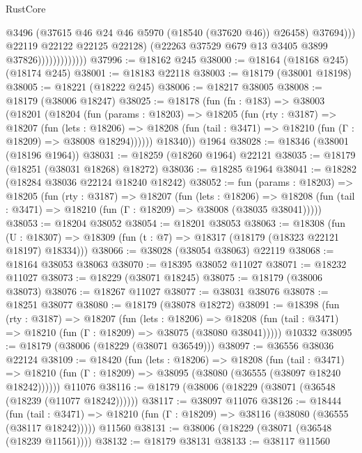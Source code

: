 \begin{lexlean}{RustCore}
\begin{coremodule}
                                    @3496
                                    (@37615 @46 @24 @46 @5970 (@18540 (@37620 @46)) @26458)
                                    @37694)))
                              @22119
                              @22122
                              @22125
                              @22128)
                            (@22263 @37529 @679 @13 @3405 @3899 @37826)))))))))))))
@37996 := @18162 @245
@38000 := @18164 (@18168 @245) (@18174 @245)
@38001 := @18183 @22118
@38003 := @18179 (@38001 @18198)
@38005 := @18221 (@18222 @245)
@38006 := @18217 @38005
@38008 := @18179 (@38006 @18247)
@38025 := @18178
    (fun (fn : @183) =>
    @38003
      (@18201
        (@18204
          (fun (params : @18203) =>
          @18205
            (fun (rty : @3187) =>
            @18207
              (fun (lets : @18206) =>
              @18208 (fun (tail : @3471) => @18210 (fun (Γ : @18209) => @38008 @18294))))))
        @18340))
    @1964
@38028 := @18346 (@38001 (@18196 @1964))
@38031 := @18259 (@18260 @1964) @22121
@38035 := @18179 (@18251 (@38031 @18268) @18272)
@38036 := @18285 @1964
@38041 := @18282 (@18284 @38036 @22124 @18240 @18242)
@38052 := fun (params : @18203) =>
  @18205
    (fun (rty : @3187) =>
    @18207
      (fun (lets : @18206) =>
      @18208 (fun (tail : @3471) => @18210 (fun (Γ : @18209) => @38008 (@38035 @38041)))))
@38053 := @18204 @38052
@38054 := @18201 @38053
@38063 := @18308
    (fun (U : @18307) => @18309 (fun (t : @7) => @18317 (@18179 (@18323 @22121 @18197) @18334)))
@38066 := @38028 (@38054 @38063) @22119
@38068 := @18164 @38053 @38063
@38070 := @18395 @38052 @11027
@38071 := @18232 @11027
@38073 := @18229 (@38071 @18245)
@38075 := @18179 (@38006 @38073)
@38076 := @18267 @11027
@38077 := @38031 @38076
@38078 := @18251 @38077
@38080 := @18179 (@38078 @18272)
@38091 := @18398
    (fun (rty : @3187) =>
    @18207
      (fun (lets : @18206) =>
      @18208 (fun (tail : @3471) => @18210 (fun (Γ : @18209) => @38075 (@38080 @38041)))))
    @10332
@38095 := @18179 (@38006 (@18229 (@38071 @36549)))
@38097 := @36556 @38036 @22124
@38109 := @18420
    (fun (lets : @18206) =>
    @18208
      (fun (tail : @3471) =>
      @18210 (fun (Γ : @18209) => @38095 (@38080 (@36555 (@38097 @18240 @18242))))))
    @11076
@38116 := @18179 (@38006 (@18229 (@38071 (@36548 (@18239 (@11077 @18242))))))
@38117 := @38097 @11076
@38126 := @18444
    (fun (tail : @3471) => @18210 (fun (Γ : @18209) => @38116 (@38080 (@36555 (@38117 @18242)))))
    @11560
@38131 := @38006 (@18229 (@38071 (@36548 (@18239 @11561))))
@38132 := @18179 @38131
@38133 := @38117 @11560

\end{coremodule}
\end{lexlean}
